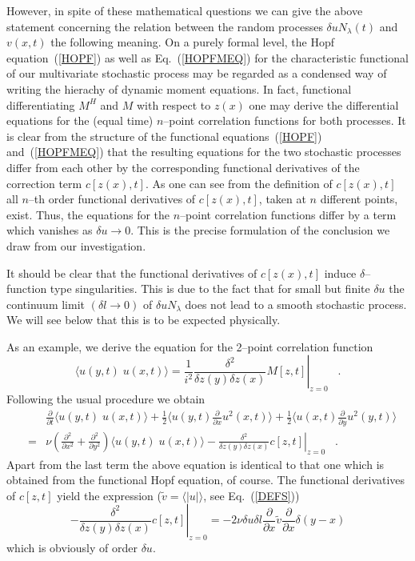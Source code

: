 However, in spite of these
mathematical questions we can give the above statement
concerning the relation between the random processes
$\delta u N_{\lambda}(t)$
and $v(x,t)$ the following meaning. On a purely formal level,
the Hopf equation~(\ref{HOPF}) as well as 
Eq.~(\ref{HOPFMEQ}) for the characteristic functional of our
multivariate
stochastic process may be regarded as a condensed way
of writing the hierachy of dynamic moment equations.
In fact, functional
differentiating $M^H$ and $M$ with respect to $z(x)$ one may
derive the
differential
equations for the (equal time) $n$--point correlation
functions for both
processes. It is clear from the structure of the functional
equations~(\ref{HOPF}) and~(\ref{HOPFMEQ}) that
the resulting equations for the two stochastic processes
differ from each
other by the corresponding functional derivatives of the
correction term
$c[z(x),t]$. As one can see from the definition of $c[z(x),t]$ all
$n$--th order functional derivatives of $c[z(x),t]$,
taken at $n$ different points, exist. Thus, the equations for the
$n$--point
correlation functions differ by a term which vanishes as $\delta u
\longrightarrow 0$. This
is the precise formulation of the conclusion we draw from our
investigation.

It should be clear that the functional derivatives of $c[z(x),t]$
induce
$\delta$--function type singularities. This is due to the fact
that for
small but finite $\delta u$ the continuum limit
$(\delta l \longrightarrow 0)$ of $\delta u N_{\lambda}$
does not lead to a smooth stochastic process. We will see
below that this
is to be expected physically.

As an example, we derive the equation for the 2--point
correlation function
\begin{displaymath}
\langle u(y,t) \; u(x,t) \rangle = \left. \frac{1}{i^2}
\frac{\delta^2}{\delta z (y) \delta z(x)} M [z,t] \right|_{z=0}
\;\;\; .
\end{displaymath}
Following the usual procedure we obtain
\begin{eqnarray}
& & \frac{\partial}{\partial t} \langle u(y,t) \; u(x,t) \rangle
+ \frac{1}{2} \langle u(y,t) \frac{\partial}{\partial x} u^2(x,t)
 \rangle
+ \frac{1}{2} \langle u(x,t) \frac{\partial}{\partial y} u^2(y,t)
\rangle
\nonumber \\
&=& \nu \left( \frac{\partial^2}{\partial x^2} +
\frac{\partial^2}{\partial y^2} \right) \langle u(y,t) \; u(x,t)
\rangle
- \left. \frac{\delta^2}{\delta z (y) \delta z(x)} c[z,t]
\right|_{z=0}
\;\;\; .   \label{CORR}
\end{eqnarray}
Apart from the last term the above equation is identical to that one
which is obtained from the functional Hopf equation, of course. The
functional derivatives of $c[z,t]$ yield the expression
($\tilde{v} = \langle \mid u \mid \rangle $, see Eq.~(\ref{DEFS}))
\begin{equation}
\left. - \frac{\delta^2}{\delta z (y) \delta z(x)} c[z,t]
\right|_{z=0} =
-2\nu \delta u \delta l \frac{\partial}{\partial x}
\tilde{v} \frac{\partial}{\partial x}
\delta (y-x)     \label{RDMFLUX}
\end{equation}
which is obviously of order $\delta u$.

